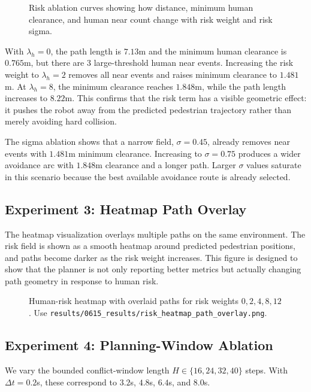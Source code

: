 \documentclass[10pt,twocolumn,letterpaper]{article}
\begin{document}
\begin{figure}[t]
    \centering
    \caption{Risk ablation curves showing how distance, minimum human clearance, and human near count change with risk weight and risk sigma.}
    \label{fig:risk_ablation}
\end{figure}

With $\lambda_h=0$, the path length is $7.13$m and the minimum human clearance is $0.765$m, but there are 3 large-threshold human near events. Increasing the risk weight to $\lambda_h=2$ removes all near events and raises minimum clearance to $1.481$m. At $\lambda_h=8$, the minimum clearance reaches $1.848$m, while the path length increases to $8.22$m. This confirms that the risk term has a visible geometric effect: it pushes the robot away from the predicted pedestrian trajectory rather than merely avoiding hard collision.

The sigma ablation shows that a narrow field, $\sigma=0.45$, already removes near events with $1.481$m minimum clearance. Increasing to $\sigma=0.75$ produces a wider avoidance arc with $1.848$m clearance and a longer path. Larger $\sigma$ values saturate in this scenario because the best available avoidance route is already selected.

\subsection{Experiment 3: Heatmap Path Overlay}
The heatmap visualization overlays multiple paths on the same environment. The risk field is shown as a smooth heatmap around predicted pedestrian positions, and paths become darker as the risk weight increases. This figure is designed to show that the planner is not only reporting better metrics but actually changing path geometry in response to human risk.

\begin{figure}[t]
    \centering
    \caption{Human-risk heatmap with overlaid paths for risk weights $0,2,4,8,12$. Use \texttt{results/0615\_results/risk\_heatmap\_path\_overlay.png}.}
    \label{fig:heatmap_overlay}
\end{figure}

\subsection{Experiment 4: Planning-Window Ablation}
We vary the bounded conflict-window length $H \in \{16,24,32,40\}$ steps. With $\Delta t=0.2$s, these correspond to $3.2$s, $4.8$s, $6.4$s, and $8.0$s.
\end{document}
